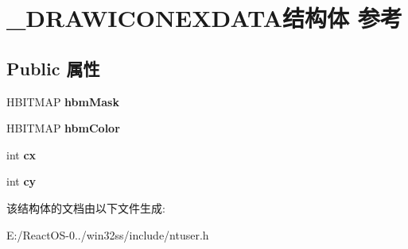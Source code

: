 \hypertarget{struct___d_r_a_w_i_c_o_n_e_x_d_a_t_a}{}\section{\+\_\+\+D\+R\+A\+W\+I\+C\+O\+N\+E\+X\+D\+A\+T\+A结构体 参考}
\label{struct___d_r_a_w_i_c_o_n_e_x_d_a_t_a}
\subsection*{Public 属性}
\begin{DoxyCompactItemize}
\item 
\mbox{\label{struct___d_r_a_w_i_c_o_n_e_x_d_a_t_a_a8eb9f341e06862e9a7199c4a5ab887c9}} 
H\+B\+I\+T\+M\+AP {\bfseries hbm\+Mask}
\item 
\mbox{\label{struct___d_r_a_w_i_c_o_n_e_x_d_a_t_a_a0fac93be59d3ce8fb70768f22e45b16e}} 
H\+B\+I\+T\+M\+AP {\bfseries hbm\+Color}
\item 
\mbox{\label{struct___d_r_a_w_i_c_o_n_e_x_d_a_t_a_a4f65a9046babeeaf77ca79c8c000d444}} 
int {\bfseries cx}
\item 
\mbox{\label{struct___d_r_a_w_i_c_o_n_e_x_d_a_t_a_a3552f8400b597d4facfe1b33b3dd0ba1}} 
int {\bfseries cy}
\end{DoxyCompactItemize}


该结构体的文档由以下文件生成\+:\begin{DoxyCompactItemize}
\item 
E\+:/\+React\+O\+S-\/0../win32ss/include/ntuser.\+h\end{DoxyCompactItemize}
